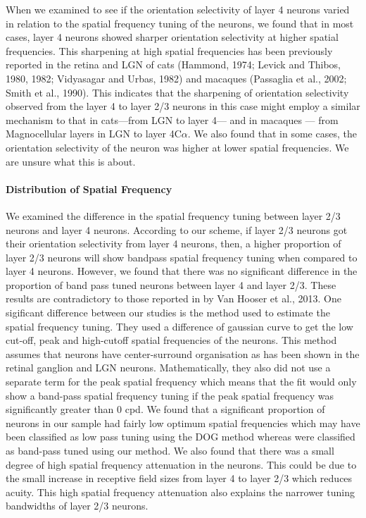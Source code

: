When we examined to see if the orientation selectivity of layer 4 neurons varied in relation to the spatial frequency tuning of the neurons, we found that in most cases, layer 4 neurons showed sharper orientation selectivity at higher spatial frequencies. This sharpening at high spatial frequencies has been previously reported in the retina and LGN of cats (Hammond, 1974; Levick and Thibos, 1980, 1982; Vidyasagar and Urbas, 1982) and macaques (Passaglia et al., 2002; Smith et al., 1990). This indicates that the sharpening of orientation selectivity observed from the layer 4 to layer 2/3 neurons in this case might employ a similar mechanism to that in cats---from LGN to layer 4--- and in macaques --- from Magnocellular layers in LGN to layer 4C$\alpha$. We also found that in some cases, the orientation selectivity of the neuron was higher at lower spatial frequencies. We are unsure what this is about.


\paragraph{Distribution of Spatial Frequency}

We examined the difference in the spatial frequency tuning between layer 2/3 neurons and layer 4 neurons. According to our scheme, if layer 2/3 neurons got their orientation selectivity from layer 4 neurons, then, a higher proportion of layer 2/3 neurons will show bandpass spatial frequency tuning when compared to layer 4 neurons. However, we found that there was no significant difference in the proportion of band pass tuned neurons between layer 4 and layer 2/3. These results are contradictory to those reported in by Van Hooser et al., 2013. One sigificant difference between our studies is the method used to estimate the spatial frequency tuning. They used a difference of gaussian curve to get the low cut-off, peak and high-cutoff spatial frequencies of the neurons. This method assumes that neurons have center-surround organisation as has been shown in the retinal ganglion and LGN neurons. Mathematically, they also did not use a separate term for the peak spatial frequency which means that the fit would only show a band-pass spatial frequency tuning if the peak spatial frequency was significantly greater than 0 cpd. We found that a significant proportion of neurons in our sample had fairly low optimum spatial frequencies which  may have been classified as low pass tuning using the DOG method whereas were classified as band-pass tuned using our method. We also found that there was a small degree of high spatial frequency attenuation in the neurons. This could be due to the small increase in receptive field sizes from layer 4 to layer 2/3 which reduces acuity. This high spatial frequency attenuation also explains the narrower tuning bandwidths of layer 2/3 neurons.

